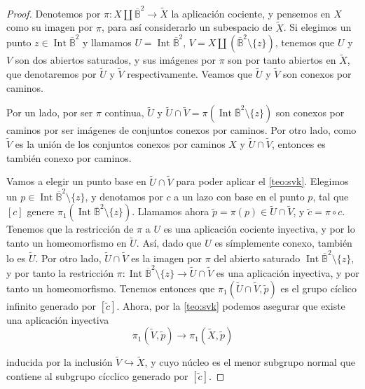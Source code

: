 \documentclass[10pt]{report}
\DeclareMathOperator{\interior}{Int} %
\newcommand{\Disco}{\overline{\mathbb{B}}^2}
\theoremstyle{definition}
\begin{document}
\begin{proof}
Denotemos por $\pi :X\amalg \Disco \to \tilde{X}$ la aplicación cociente, y pensemos en $X$ como su imagen por $\pi$, para así considerarlo un subespacio de $\tilde{X}$.
Si elegimos un punto $z\in \interior{\Disco}$ y llamamos $U=\interior{\Disco}$, $V=X\amalg \left( \Disco \setminus \{ z \} \right)$, tenemos que $U$ y $V$ son dos abiertos saturados, y sus imágenes por $\pi$ son por tanto abiertos en $\tilde{X}$, que denotaremos por $\tilde{U}$ y $\tilde{V}$ respectivamente. Veamos que $\tilde{U}$ y $\tilde{V}$ son conexos por caminos.

Por un lado, por ser $\pi$ continua, $\tilde{U}$ y $\tilde{U}\cap \tilde{V}=\pi (\interior{\Disco} \setminus \{ z \} ) $ son conexos por caminos por ser imágenes de conjuntos conexos por caminos. Por otro lado, como $\tilde{V}$ es la unión de los conjuntos conexos por caminos $X$ y $\tilde{U} \cap \tilde{V}$, entonces es también conexo por caminos.

Vamos a elegir un punto base en $\tilde{U} \cap \tilde{V}$ para poder aplicar el \autoref{teo:svk}. Elegimos un $p\in \interior{\Disco} \setminus \{ z \}$, y denotamos por $c$ a un lazo con base en el punto $p$, tal que $\left[ c \right]$ genere $\pi_1 (\interior{\Disco} \setminus \{ z \} )$. Llamamos ahora $\tilde{p}=\pi (p) \in \tilde{U} \cap \tilde{V}$, y $\tilde{c} = \pi \circ c$. 
Tenemos que la restricción de $\pi$ a $U$ es una aplicación cociente inyectiva, y por lo tanto un homeomorfismo en $\tilde{U}$. Así, dado que $U$ es símplemente conexo, también lo es $\tilde{U}$. Por otro lado, $\tilde{U} \cap \tilde{V}$ es la imagen por $\pi$ del abierto saturado $\interior{\Disco} \setminus \{ z \}$, y por tanto la restricción $\pi : \interior{\Disco} \setminus \{ z \} \to \tilde{U} \cap \tilde{V}$ es una aplicación inyectiva, y por tanto un homeomorfismo. Tenemos entonces que $\pi_1 (\tilde{U} \cap \tilde{V} , \tilde{p})$ es el grupo cíclico infinito generado por $\left[ \tilde{c} \right]$. Ahora, por la \autoref{teo:svk} podemos asegurar que existe una aplicación inyectiva
\[
\pi_1 (\tilde{V} , \tilde{p} ) \to \pi_1 (\tilde{X} , \tilde{p} )
\]

inducida por la inclusión $\tilde{V} \hookrightarrow \tilde{X}$, y cuyo núcleo es el menor subgrupo normal que contiene al subgrupo cícclico generado por $\left[ \tilde{c} \right]$. 


\end{proof}
\end{document}
